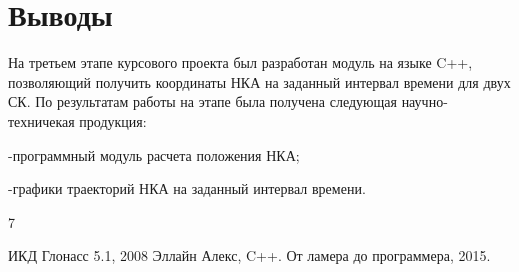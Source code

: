 \documentclass[]{article}
\begin{document}
\section{Выводы}

На третьем этапе курсового проекта был разработан модуль на языке C++, позволяющий получить координаты НКА на заданный интервал времени для двух СК.  По результатам работы на этапе была получена следующая научно-техничекая продукция:

-программный модуль расчета положения НКА;

-графики траекторий НКА на заданный интервал времени.


\newpage
{}
\begin{thebibliography} {7}
	
	 ИКД Глонасс 5.1, 2008
	 Эллайн Алекс, C++. От ламера до программера, 2015.
	

\end{thebibliography}
\end{document}
